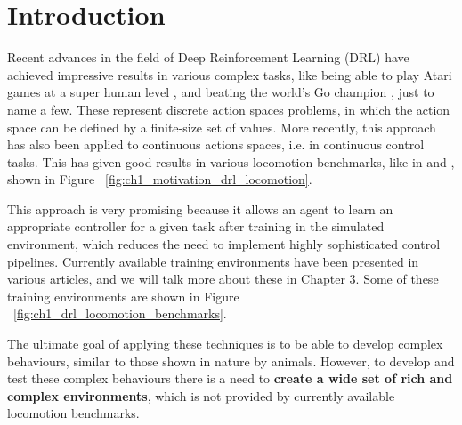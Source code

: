 \chapter{Introduction}
\label{ch:intro}



Recent advances in the field of Deep Reinforcement Learning (DRL) have achieved impressive
results in various complex tasks, like being able to play Atari games at a super human level \citep{DQNAtari}, 
and beating the world's Go champion \citep{AlphaGo}, just to name a few. These represent discrete 
action spaces problems, in which the action space can be defined by a finite-size set of values. 
More recently, this approach has also been applied to continuous actions spaces, i.e. in continuous 
control tasks. This has given good results in various locomotion benchmarks, like in 
\citeauthor{DeepmindEmergenceLocomotion} and \citeauthor{DeepMimic}, shown in Figure ~\ref{fig:ch1_motivation_drl_locomotion}.

\figDrlLocomotionMotivation

This approach is very promising because it allows an agent to learn an appropriate controller for a given task after training in
the simulated environment, which reduces the need to implement highly sophisticated control pipelines. Currently available 
training environments have been presented in various articles, and we will talk more about these in Chapter 3.
Some of these training environments are shown in Figure ~\ref{fig:ch1_drl_locomotion_benchmarks}.

The ultimate goal of applying these techniques is to be able to develop complex behaviours, similar
to those shown in nature by animals. However, to develop and test these complex behaviours there is a need to \textbf{create
a wide set of rich and complex environments}, which is not provided by currently available locomotion benchmarks.

\figDrlBenchmarks

